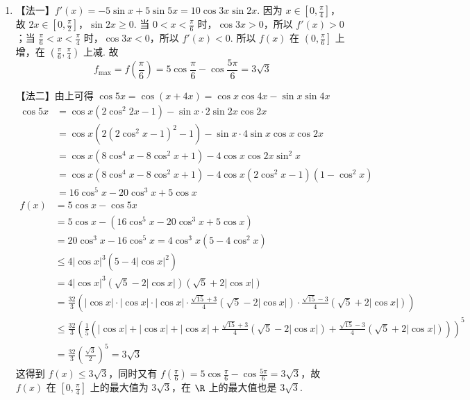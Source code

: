 \begin{solution}
\begin{enumerate}
\item 【法一】\(f'(x) = -5\sin x + 5\sin 5x = 10\cos 3x\sin 2x\). 因为 \(x \in \left[0, \frac{\pi}{4}\right]\)，故 \(2x \in \left[0, \frac{\pi}{2}\right]\)，\(\sin 2x \ge 0\). 当 \(0 < x < \frac{\pi}{6}\) 时，\(\cos 3x > 0\)，所以 \(f'(x) > 0\)；当 \(\frac{\pi}{6} < x < \frac{\pi}{4}\) 时，\(\cos 3x < 0\)，所以 \(f'(x) < 0\). 所以 \(f(x)\) 在 \(\left(0, \frac{\pi}{6}\right]\) 上增，在 \(\left(\frac{\pi}{6}, \frac{\pi}{4}\right)\) 上减. 故
\[
f_{\max} = f\left(\frac{\pi}{6}\right) = 5\cos \frac{\pi}{6} - \cos \frac{5\pi}{6} = 3\sqrt{3}
\]

【法二】由上可得 \(\cos 5x = \cos (x + 4x)=\cos x\cos 4x-\sin x\sin 4x\)
\begin{align*}
\cos 5x &= \cos x (2\cos^2 2x - 1) - \sin x \cdot 2\sin 2x \cos 2x \\
&= \cos x (2(2\cos^2 x - 1)^2 - 1) - \sin x \cdot 4 \sin x \cos x \cos 2x \\
&= \cos x (8\cos^4 x - 8\cos^2 x + 1) - 4\cos x \cos 2x \sin^2 x \\
&= \cos x\left(8\cos^4 x - 8\cos^2 x + 1\right) - 4\cos x(2\cos^2 x - 1)(1-\cos^2 x) \\
&= 16\cos^5 x - 20\cos^3 x + 5\cos x
\end{align*}
\begin{align*}
f(x) &= 5\cos x - \cos 5x \\
&= 5\cos x - (16\cos^5 x - 20\cos^3 x + 5\cos x) \\
&= 20\cos^3 x - 16\cos^5 x=4\cos^3 x(5 - 4\cos^2 x) \\
&\le 4|\cos x|^3(5 - 4|\cos x|^2) \\
&= 4|\cos x|^3(\sqrt{5} - 2|\cos x|)(\sqrt{5} + 2|\cos x|) \\
&= \frac{32}{3}\left(|\cos x| \cdot |\cos x| \cdot |\cos x| \cdot \frac{\sqrt{15} + 3}{4}(\sqrt{5} - 2|\cos x|) \cdot \frac{\sqrt{15} - 3}{4}(\sqrt{5} + 2|\cos x|)\right) \\
&\le \frac{32}{3}\left(\frac{1}{5}\left(|\cos x| + |\cos x| + |\cos x| + \frac{\sqrt{15} + 3}{4}(\sqrt{5} - 2|\cos x|) + \frac{\sqrt{15} - 3}{4}(\sqrt{5} + 2|\cos x|)\right)\right)^5 \\
&= \frac{32}{3}\left(\frac{\sqrt{3}}{2}\right)^5 = 3\sqrt{3}
\end{align*}
这得到 \(f(x) \le 3\sqrt{3}\)，同时又有 \(f\left(\frac{\pi}{6}\right) = 5\cos \frac{\pi}{6} - \cos \frac{5\pi}{6} = 3\sqrt{3}\)，故 \(f(x)\) 在 \(\left[0, \frac{\pi}{4}\right]\) 上的最大值为 \(3\sqrt{3}\)，在 \(\R\) 上的最大值也是 \(3\sqrt{3}\).


\end{enumerate}
\end{solution}

